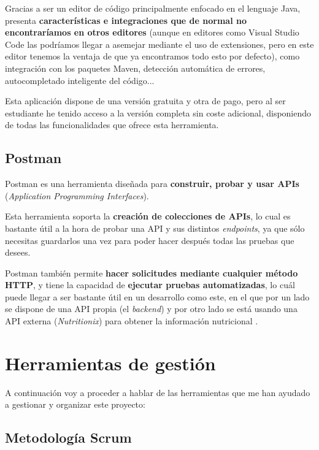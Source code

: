 Gracias a ser un editor de código principalmente enfocado en el lenguaje Java, presenta \textbf{características e integraciones que de normal no encontraríamos en otros editores} (aunque en editores como Visual Studio Code las podríamos llegar a asemejar mediante el uso de extensiones, pero en este editor tenemos la ventaja de que ya encontramos todo esto por defecto), como integración con los paquetes Maven, detección automática de errores, autocompletado inteligente del código... \cite{jetbrains:idea}

Esta aplicación dispone de una versión gratuita y otra de pago, pero al ser estudiante he tenido acceso a la versión completa sin coste adicional, disponiendo de todas las funcionalidades que ofrece esta herramienta. \cite{jetbrains:students}

\subsection{Postman}

Postman es una herramienta diseñada para \textbf{construir, probar y usar APIs} (\textit{Application Programming Interfaces}).

Esta herramienta soporta la \textbf{creación de colecciones de APIs}, lo cual es bastante útil a la hora de probar una API y sus distintos \textit{endpoints}, ya que sólo necesitas guardarlos una vez para poder hacer después todas las pruebas que desees.

Postman también permite\textbf{ hacer solicitudes mediante cualquier método HTTP}, y tiene la capacidad de \textbf{ejecutar pruebas automatizadas}, lo cuál puede llegar a ser bastante útil en un desarrollo como este, en el que por un lado se dispone de una API propia (el \textit{backend}) y por otro lado se está usando una API externa (\textit{Nutritionix}) para obtener la información nutricional \cite{postman:main}.


\section{Herramientas de gestión}

A continuación voy a proceder a hablar de las herramientas que me han ayudado a gestionar y organizar este proyecto:

\subsection{Metodología Scrum}

